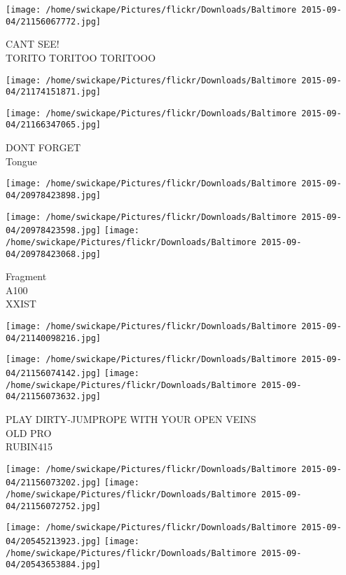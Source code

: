 \documentclass[10pt,letterpaper]{article}
\begin{document}
\vspace{0.25in}
\texttt{[image: /home/swickape/Pictures/flickr/Downloads/Baltimore 2015-09-04/21156067772.jpg]}

CANT SEE!\\
TORITO TORITOO TORITOOO\\
\pagebreak

\texttt{[image: /home/swickape/Pictures/flickr/Downloads/Baltimore 2015-09-04/21174151871.jpg]}

\vspace{0.25in}
\texttt{[image: /home/swickape/Pictures/flickr/Downloads/Baltimore 2015-09-04/21166347065.jpg]}

DONT FORGET\\
Tongue\\
\pagebreak

\texttt{[image: /home/swickape/Pictures/flickr/Downloads/Baltimore 2015-09-04/20978423898.jpg]}

\vspace{0.25in}
\texttt{[image: /home/swickape/Pictures/flickr/Downloads/Baltimore 2015-09-04/20978423598.jpg]}
\texttt{[image: /home/swickape/Pictures/flickr/Downloads/Baltimore 2015-09-04/20978423068.jpg]}

Fragment\\
A100\\
XXIST\\
\pagebreak

\texttt{[image: /home/swickape/Pictures/flickr/Downloads/Baltimore 2015-09-04/21140098216.jpg]}

\vspace{0.25in}
\texttt{[image: /home/swickape/Pictures/flickr/Downloads/Baltimore 2015-09-04/21156074142.jpg]}
\texttt{[image: /home/swickape/Pictures/flickr/Downloads/Baltimore 2015-09-04/21156073632.jpg]}

PLAY DIRTY{-}JUMPROPE WITH YOUR OPEN VEINS\\
OLD PRO\\
RUBIN415\\
\pagebreak

\texttt{[image: /home/swickape/Pictures/flickr/Downloads/Baltimore 2015-09-04/21156073202.jpg]}
\texttt{[image: /home/swickape/Pictures/flickr/Downloads/Baltimore 2015-09-04/21156072752.jpg]}

\texttt{[image: /home/swickape/Pictures/flickr/Downloads/Baltimore 2015-09-04/20545213923.jpg]}
\texttt{[image: /home/swickape/Pictures/flickr/Downloads/Baltimore 2015-09-04/20543653884.jpg]}
\end{document}
